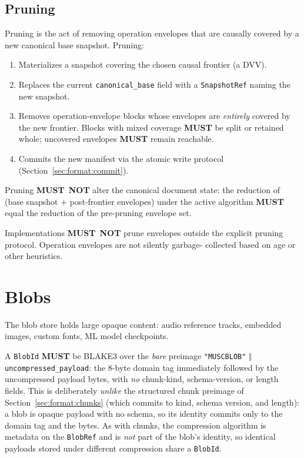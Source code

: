 \documentclass[11pt,letterpaper]{report}
\newcounter{requirement}[chapter]
\newcommand{\MUST}{\textbf{MUST}}
\newcommand{\MUSTNOT}{\textbf{MUST}\nobreak\ \textbf{NOT}}
\begin{document}
\subsection{Pruning}

\begin{requirement}
  \label{req:format:pruning-state-preservation}
  Pruning is the act of removing operation envelopes that are
  causally covered by a new canonical base snapshot. Pruning:

  \begin{enumerate}
    \item Materializes a snapshot covering the chosen causal
      frontier (a DVV).
    \item Replaces the current \texttt{canonical\_base} field
      with a \texttt{SnapshotRef} naming the new snapshot.
    \item Removes operation-envelope blocks whose envelopes are
      \emph{entirely} covered by the new frontier. Blocks with
      mixed coverage \MUST{} be split or retained whole;
      uncovered envelopes \MUST{} remain reachable.
    \item Commits the new manifest via the atomic write protocol
      (Section~\ref{sec:format:commit}).
  \end{enumerate}

  Pruning \MUSTNOT{} alter the canonical document state: the
  reduction of (base snapshot $+$ post-frontier envelopes) under
  the active algorithm \MUST{} equal the reduction of the
  pre-pruning envelope set.

  Implementations \MUSTNOT{} prune envelopes outside the explicit
  pruning protocol. Operation envelopes are not silently garbage-
  collected based on age or other heuristics.
\end{requirement}

\section{Blobs}
\label{sec:format:blobs}

The blob store holds large opaque content: audio reference tracks,
embedded images, custom fonts, ML model checkpoints.

\begin{requirement}
  \label{req:format:blob-hash-shape}
  A \texttt{BlobId} \MUST{} be BLAKE3 over the \emph{bare} preimage
  \texttt{"MUSCBLOB"} $\Vert$ \texttt{uncompressed\_payload}: the
  8-byte domain tag immediately followed by the uncompressed payload
  bytes, with \emph{no} chunk-kind, schema-version, or length fields.
  This is deliberately \emph{unlike} the structured chunk preimage of
  Section~\ref{sec:format:chunks} (which commits to kind, schema
  version, and length): a blob is opaque payload with no schema, so
  its identity commits only to the domain tag and the bytes. As with
  chunks, the compression algorithm is metadata on the
  \texttt{BlobRef} and is \emph{not} part of the blob's identity, so
  identical payloads stored under different compression share a
  \texttt{BlobId}.
\end{requirement}
\end{document}
